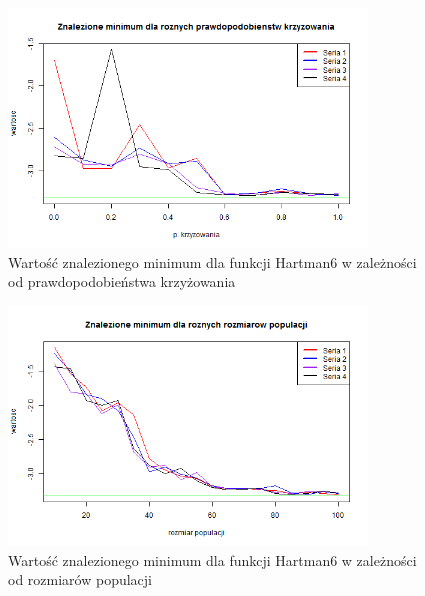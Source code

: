 \documentclass[11pt, a4paper]{article}
\begin{document}
\begin{figure}[H]
	\begin{center}
		\includegraphics[width=0.85\textwidth]{./assets/Hartman63.png}
		\caption{Wartość znalezionego minimum dla funkcji Hartman6 w zależności od prawdopodobieństwa krzyżowania}
		\label{fig:hartman63}
	\end{center}
\end{figure}

\begin{figure}[H]
	\begin{center}
		\includegraphics[width=0.85\textwidth]{./assets/Hartman64.png}
		\caption{Wartość znalezionego minimum dla funkcji Hartman6 w zależności od rozmiarów populacji}
		\label{fig:hartman64}
	\end{center}
\end{figure}
\end{document}
